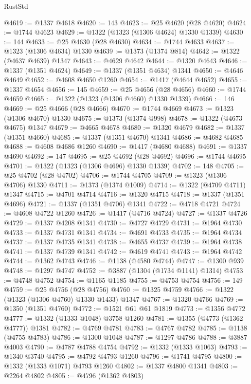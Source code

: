 \begin{lexlean}{RustStd}
\begin{coremodule}
@4619 := @1337 @4618
@4620 := 143
@4623 := @25 @4620 (@28 @4620)
@4624 := @1744 @4623
@4629 := @1322 (@1323 (@1306 @4624) @1330 @1339)
@4630 := 144
@4633 := @25 @4630 (@28 @4630)
@4634 := @1744 @4633
@4637 := @1323 (@1306 @4634) @1330
@4639 := @1373 (@1374 @814)
@4642 := @1322 (@4637 @4639) @1347
@4643 := @4629 @4642
@4644 := @1320 @4643
@4646 := @1337 (@1351 @4624)
@4649 := @1337 (@1351 @4634) @1341
@4650 := @4646 @4649
@4652 := @4608 @4650 @1260
@4654 := @1417 (@4644 @4652)
@4655 := @1337 @4654
@4656 := 145
@4659 := @25 @4656 (@28 @4656)
@4660 := @1744 @4659
@4665 := @1322 (@1323 (@1306 @4660) @1330 @1339)
@4666 := 146
@4669 := @25 @4666 (@28 @4666)
@4670 := @1744 @4669
@4673 := @1323 (@1306 @4670) @1330
@4675 := @1373 (@1374 @998)
@4678 := @1322 (@4673 @4675) @1347
@4679 := @4665 @4678
@4680 := @1320 @4679
@4682 := @1337 (@1351 @4660)
@4685 := @1337 (@1351 @4670) @1341
@4686 := @4682 @4685
@4688 := @4608 @4686 @1260
@4690 := @1417 (@4680 @4688)
@4691 := @1337 @4690
@4692 := 147
@4695 := @25 @4692 (@28 @4692)
@4696 := @1744 @4695
@4701 := @1322 (@1323 (@1306 @4696) @1330 @1339)
@4702 := 148
@4705 := @25 @4702 (@28 @4702)
@4706 := @1744 @4705
@4709 := @1323 (@1306 @4706) @1330
@4711 := @1373 (@1374 @1009)
@4714 := @1322 (@4709 @4711) @1347
@4715 := @4701 @4714
@4716 := @1320 @4715
@4718 := @1337 (@1351 @4696)
@4721 := @1337 (@1351 @4706) @1341
@4722 := @4718 @4721
@4724 := @4608 @4722 @1260
@4726 := @1417 (@4716 @4724)
@4727 := @1337 @4726
@4729 := @1337 @4208 @1341
@4730 := @4727 @4729
@4731 := @1964 @4730
@4733 := @1337 @4731 @1341
@4734 := @4691 @4733
@4735 := @1964 @4734
@4737 := @1337 @4735 @1341
@4738 := @4655 @4737
@4739 := @1964 @4738
@4741 := @1337 @4739 @1341
@4742 := @4619 @4741
@4743 := @1964 @4742
@4744 := @1362 @4743
@4746 := @1138 (@4580 @4744)
@4747 := @1300 @939
@4748 := @1297 @4747
@4752 := @3887 (@1304 (@1734 @1141) @1314)
@4753 := @4748 @4752
@4754 := @1165 @1185
@4755 := @4753 @4754
@4756 := 149
@4759 := @25 @4756 (@28 @4756)
@4760 := @1325 @4759
@4766 := @1322 (@1323 (@1306 @4760) @1330 @1433) @1347
@4767 := @1320 @4766
@4769 := @1350 (@1351 @4760)
@4772 := @1521 @61 @61 @1819
@4773 := @1356 @4772
@4777 := @1332 (@1333 @1048) @3758 @1260
@4781 := @1355 (@4773 (@1362 @4777)) @1381
@4782 := @4769 @4781
@4783 := @4767 @4782
@4785 := @1138 (@4755 @4783)
@4786 := @1300 @1048
@4787 := @1297 @4786
@4788 := @3887 @4003
@4790 := @4787 @4788 @4754
@4792 := @1332 (@1333 @1063)
@4793 := @1340 @3740
@4795 := @4792 @4793 @1260
@4796 := @1741 @4795
@4800 := @1332 (@1333 @1071) @4793 @1260
@4802 := @1337 @4800 @1341
@4803 := @2264 @4802
@4805 := @4796 (@1362 @4803)

\end{coremodule}
\end{lexlean}
